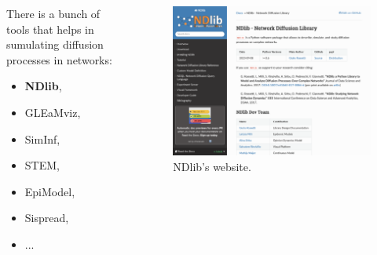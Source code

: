 \documentclass{beamer}
\begin{document}
\begin{frame}{\secname}
    \begin{columns}[T]
        \begin{column}{.35\textwidth}
            There is a bunch of tools that helps in sumulating diffusion processes in networks:
            \begin{itemize}
                \item \textbf{NDlib}\cite{ndlib},
                \item GLEaMviz\cite{gleam},
                \item SimInf\cite{siminf},
                \item STEM\cite{stem},
                \item EpiModel\cite{jenness2018epimodel},
                \item Sispread\cite{sispread},
                \item ...
            \end{itemize}
        \end{column}
        \hfill
        \begin{column}{.60\textwidth}
            \begin{figure}[ht]
                \centering
                \includegraphics[width=1\textwidth]{figures/ndlib.png}
                \caption{NDlib's website.}
            \end{figure}
        \end{column}
    \end{columns}
\end{frame}
\end{document}

